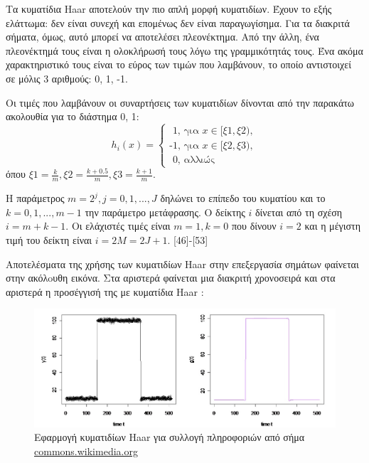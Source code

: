 Τα κυματίδια \en Haar \gr αποτελούν την πιο απλή μορφή κυματιδίων. Έχουν το εξής ελάττωμα: δεν είναι συνεχή και επομένως δεν είναι παραγωγίσημα. Για τα διακριτά σήματα, όμως, αυτό μπορεί να αποτελέσει πλεονέκτημα. Από την άλλη, ένα πλεονέκτημά τους είναι η ολοκλήρωσή τους λόγω της γραμμικότητάς τους. Ένα ακόμα χαρακτηριστικό τους είναι το εύρος των τιμών που λαμβάνουν, το οποίο αντιστοιχεί σε μόλις 3 αριθμούς: 0, 1, -1. 
\par
Οι τιμές που λαμβάνουν οι συναρτήσεις των κυματιδίων δίνονται από την παρακάτω ακολουθία για το διάστημα 0, 1:
\begin{equation}
	h_i (x) = \begin{cases}
		\text{ 1,  για } x \in [\xi 1, \xi2), \\
		\text{-1, για } x \in [\xi 2, \xi 3), \\
		\text{ 0, αλλιώς}
	\end{cases}
\end{equation}
όπου $\xi 1 = \frac{k}{m}, \xi 2 = \frac{k + 0.5}{m}, \xi 3 = \frac{k + 1}{m}$.
\par\par
Η παράμετρος $m = 2^j, j = 0, 1, ..., J$ δηλώνει το επίπεδο του κυματίου και το $k = 0, 1, ..., m-1$ την παράμετρο μετάφρασης. Ο δείκτης $i$ δίνεται από τη σχέση $i = m + k - 1$. Οι ελάχιστές τιμές είναι  $m = 1, k = 0 $ που δίνουν $i = 2$ και η μέγιστη τιμή του δείκτη είναι $i = 2M = 2J + 1$. [46]-[53]
\par
Αποτελέσματα της χρήσης των κυματιδίων \en Haar \gr στην επεξεργασία σημάτων φαίνεται στην ακόλoυθη εικόνα. Στα αριστερά φαίνεται μια διακριτή χρονοσειρά και στα αριστερά η προσέγγισή της με κυματίδια \en Haar \gr:
\begin{figure}[h!]
	\centering
	\includegraphics[scale = 0.4]{haar2.png}    
	\caption{\gr Εφαρμογή κυματιδίων \en Haar \gr για συλλογή πληροφοριών από σήμα \en\protect\url{commons.wikimedia.org}}
\end{figure}
